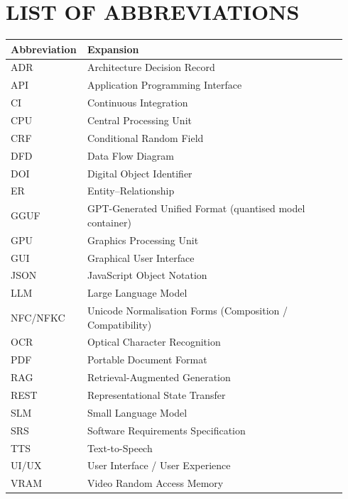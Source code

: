 \documentclass[12pt,a4paper]{report}
\begin{document}
\clearpage

\setcounter{page}{1}
\tableofcontents
\clearpage
\listoftables
\clearpage
\listoffigures
\clearpage

\chapter*{LIST OF ABBREVIATIONS}
\begin{longtable}{@{}p{0.18\linewidth}p{0.76\linewidth}@{}}
\toprule
\textbf{Abbreviation} & \textbf{Expansion} \\
\midrule
\endhead
ADR      & Architecture Decision Record \\
API      & Application Programming Interface \\
CI       & Continuous Integration \\
CPU      & Central Processing Unit \\
CRF      & Conditional Random Field \\
DFD      & Data Flow Diagram \\
DOI      & Digital Object Identifier \\
ER       & Entity--Relationship \\
GGUF     & GPT-Generated Unified Format (quantised model container) \\
GPU      & Graphics Processing Unit \\
GUI      & Graphical User Interface \\
JSON     & JavaScript Object Notation \\
LLM      & Large Language Model \\
NFC/NFKC & Unicode Normalisation Forms (Composition / Compatibility) \\
OCR      & Optical Character Recognition \\
PDF      & Portable Document Format \\
RAG      & Retrieval-Augmented Generation \\
REST     & Representational State Transfer \\
SLM      & Small Language Model \\
SRS      & Software Requirements Specification \\
TTS      & Text-to-Speech \\
UI/UX    & User Interface / User Experience \\
VRAM     & Video Random Access Memory \\
\bottomrule
\end{longtable}
\clearpage
\end{document}
